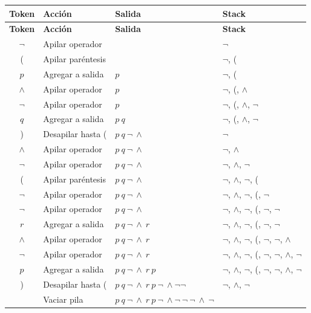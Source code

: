 \documentclass{report}
\begin{document}
	\begin{center}
		\begin{longtable}{|c|l|l|l|}
			\hline
			\textbf{Token} & \textbf{Acción} & \textbf{Salida} & \textbf{Stack} \\
			\hline
			\endfirsthead
			\hline
			\textbf{Token} & \textbf{Acción} & \textbf{Salida} & \textbf{Stack} \\
			\hline
			\endhead
			
			$\neg$ & Apilar operador & & $\neg$ \\
			\hline
			( & Apilar paréntesis & & $\neg$, ( \\
			\hline
			$p$ & Agregar a salida & $p$ & $\neg$, ( \\
			\hline
			$\wedge$ & Apilar operador & $p$ & $\neg$, (, $\wedge$ \\
			\hline
			$\neg$ & Apilar operador & $p$ & $\neg$, (, $\wedge$, $\neg$ \\
			\hline
			$q$ & Agregar a salida & $p\ q$ & $\neg$, (, $\wedge$, $\neg$ \\
			\hline
			) & Desapilar hasta ( & $p\ q\ \neg\ \wedge$ & $\neg$ \\
			\hline
			$\wedge$ & Apilar operador & $p\ q\ \neg\ \wedge$ & $\neg$, $\wedge$ \\
			\hline
			$\neg$ & Apilar operador & $p\ q\ \neg\ \wedge$ & $\neg$, $\wedge$, $\neg$ \\
			\hline
			( & Apilar paréntesis & $p\ q\ \neg\ \wedge$ & $\neg$, $\wedge$, $\neg$, ( \\
			\hline
			$\neg$ & Apilar operador & $p\ q\ \neg\ \wedge$ & $\neg$, $\wedge$, $\neg$, (, $\neg$ \\
			\hline
			$\neg$ & Apilar operador & $p\ q\ \neg\ \wedge$ & $\neg$, $\wedge$, $\neg$, (, $\neg$, $\neg$ \\
			\hline
			$r$ & Agregar a salida & $p\ q\ \neg\ \wedge\ r$ & $\neg$, $\wedge$, $\neg$, (, $\neg$, $\neg$ \\
			\hline
			$\wedge$ & Apilar operador & $p\ q\ \neg\ \wedge\ r$ & $\neg$, $\wedge$, $\neg$, (, $\neg$, $\neg$, $\wedge$ \\
			\hline
			$\neg$ & Apilar operador & $p\ q\ \neg\ \wedge\ r$ & $\neg$, $\wedge$, $\neg$, (, $\neg$, $\neg$, $\wedge$, $\neg$ \\
			\hline
			$p$ & Agregar a salida & $p\ q\ \neg\ \wedge\ r\ p$ & $\neg$, $\wedge$, $\neg$, (, $\neg$, $\neg$, $\wedge$, $\neg$ \\
			\hline
			) & Desapilar hasta ( & $p\ q\ \neg\ \wedge\ r\ p\ \neg\ \wedge \neg \neg$ & $\neg$, $\wedge$, $\neg$ \\
			\hline
			& Vaciar pila & $p\ q\ \neg\ \wedge\ r\ p\ \neg\ \wedge \neg\ \neg\ \neg\ \wedge\ \neg$ &  \\
			\hline
		\end{longtable}
	\end{center}
\end{document}
